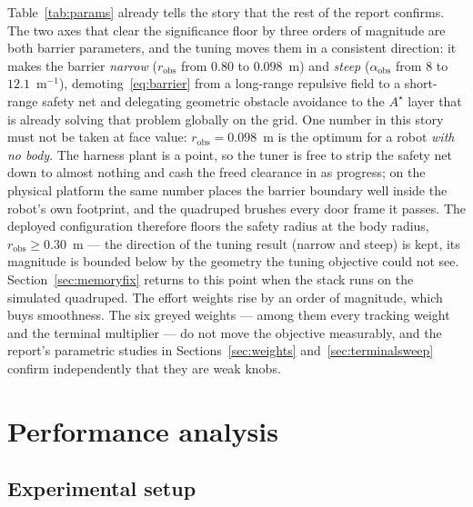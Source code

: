 \documentclass[11pt,a4paper]{article}
\newcommand{\astar}{$A^\star$}
\newcommand{\aobs}{\alpha_{\mathrm{obs}}}
\newcommand{\robs}{r_{\mathrm{obs}}}
\begin{document}
Table~\ref{tab:params} already tells the story that the rest of the report confirms. The two axes that clear
the significance floor by three orders of magnitude are both barrier parameters, and the tuning moves them in
a consistent direction: it makes the barrier \emph{narrow} ($\robs$ from $0.80$ to $0.098$~m) and
\emph{steep} ($\aobs$ from $8$ to $12.1$~m$^{-1}$), demoting~\eqref{eq:barrier} from a long-range repulsive
field to a short-range safety net and delegating geometric obstacle avoidance to the \astar{} layer that is
already solving that problem globally on the grid. One number in this story must not be taken at face
value: $\robs=0.098$~m is the optimum for a robot \emph{with no body}. The harness plant is a point, so the
tuner is free to strip the safety net down to almost nothing and cash the freed clearance in as progress;
on the physical platform the same number places the barrier boundary well inside the robot's own footprint,
and the quadruped brushes every door frame it passes. The deployed configuration therefore floors the
safety radius at the body radius, $\robs\ge0.30$~m --- the direction of the tuning result (narrow and
steep) is kept, its magnitude is bounded below by the geometry the tuning objective could not see.
Section~\ref{sec:memoryfix} returns to this point when the stack runs on the simulated quadruped. The
effort weights rise by an order of magnitude, which buys smoothness. The six greyed weights --- among them every tracking weight and the terminal multiplier ---
do not move the objective measurably, and the report's parametric studies in Sections~\ref{sec:weights}
and~\ref{sec:terminalsweep} confirm independently that they are weak knobs.

\section{Performance analysis}
\label{sec:performance}

\subsection{Experimental setup}
\label{sec:setup}
\end{document}
